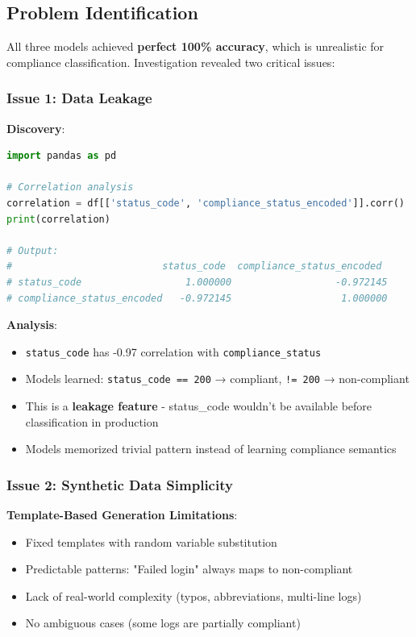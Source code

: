 \documentclass[11pt,conference]{IEEEtran}
\begin{document}
\subsection{Problem Identification}

All three models achieved \textbf{perfect 100\% accuracy}, which is unrealistic for compliance classification. Investigation revealed two critical issues:

\subsubsection{Issue 1: Data Leakage}

\textbf{Discovery}:
\begin{lstlisting}[language=Python]
import pandas as pd

# Correlation analysis
correlation = df[['status_code', 'compliance_status_encoded']].corr()
print(correlation)

# Output:
#                          status_code  compliance_status_encoded
# status_code                  1.000000                  -0.972145
# compliance_status_encoded   -0.972145                   1.000000
\end{lstlisting}

\textbf{Analysis}:
\begin{itemize}
    \item \texttt{status\_code} has -0.97 correlation with \texttt{compliance\_status}
    \item Models learned: \texttt{status\_code == 200} → compliant, \texttt{!= 200} → non-compliant
    \item This is a \textbf{leakage feature} - status\_code wouldn't be available before classification in production
    \item Models memorized trivial pattern instead of learning compliance semantics
\end{itemize}

\subsubsection{Issue 2: Synthetic Data Simplicity}

\textbf{Template-Based Generation Limitations}:
\begin{itemize}
    \item Fixed templates with random variable substitution
    \item Predictable patterns: "Failed login" always maps to non-compliant
    \item Lack of real-world complexity (typos, abbreviations, multi-line logs)
    \item No ambiguous cases (some logs are partially compliant)
\end{itemize}
\end{document}
